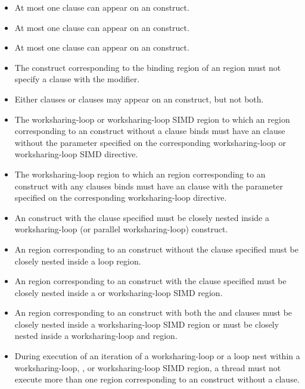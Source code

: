 \begin{itemize}
\item At most one  clause can appear on an  construct.
\item At most one  clause can appear on an  construct.
\item At most one  clause can appear on an  
      construct.
\item The construct corresponding to the binding region of an  region 
      must not specify a  clause with the  modifier.
\item Either {} clauses or 
      clauses may appear on an  construct, but not both.
\item The worksharing-loop or worksharing-loop SIMD region to which an 
      region corresponding to an  construct without a 
      clause binds must have an  clause without the parameter
      specified on the corresponding worksharing-loop or worksharing-loop SIMD 
      directive.
\item The worksharing-loop region to which an  region corresponding
      to an  construct with any  clauses binds must have 
      an  clause with the parameter specified on the corresponding 
      worksharing-loop directive.
\item An  construct with the  clause specified must
      be closely nested inside a worksharing-loop (or parallel worksharing-loop) 
      construct.
\item An  region corresponding to an  construct
      without the  clause specified must be closely nested inside a
      loop region.
\item An  region corresponding to an  construct with
      the  clause specified must be closely nested inside a
       or worksharing-loop SIMD region.
\item An  region corresponding to an  construct with
      both the  and  clauses must be closely nested inside
      a worksharing-loop SIMD region or must be closely nested inside a
      worksharing-loop and  region.
\item During execution of an iteration of a worksharing-loop or a loop nest
      within a worksharing-loop, , or worksharing-loop SIMD
      region, a thread must not execute more than one  region
      corresponding to an  construct without a  clause.
\end{itemize}

